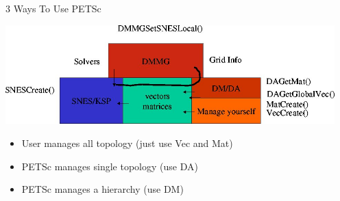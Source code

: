 \begin{frame}{3 Ways To Use PETSc}

\begin{center}
\includegraphics[width=5in]{figures/PETSc/DataManagement}
\end{center}

\begin{itemize}
  \item User manages all topology (just use Vec and Mat)

  \item PETSc manages single topology (use DA)

  \item PETSc manages a hierarchy (use DM)
\end{itemize}

\end{frame}
